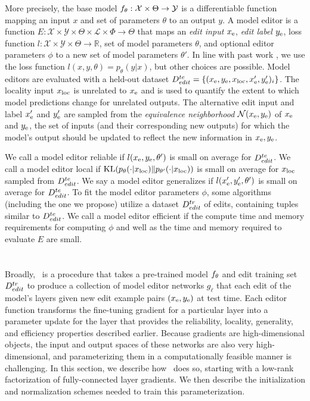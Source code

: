 \documentclass{article}
\begin{document}
More precisely, the base model $f_\theta:\mathcal{X} \times \Theta \rightarrow \mathcal{Y}$ is a differentiable function mapping an input $x$ and set of parameters $\theta$ to an output $y$. A model editor is a function $E : \mathcal{X} \times \mathcal{Y} \times \Theta \times \mathcal{L} \times \Phi \rightarrow \Theta$ that maps an \textit{edit input} $x_\text{e}$, \textit{edit label} $y_\text{e}$, loss function $l:\mathcal{X} \times \mathcal{Y} \times \Theta \rightarrow \mathbb{R}$, set of model parameters $\theta$, and optional editor parameters $\phi$ to a new set of model parameters $\theta'$. In line with past work \citep{Sinitsin2020Editable,Cao2021EditingFK}, we use the loss function $l(x,y,\theta) = p_\theta(y|x)$, but other choices are possible. Model editors are evaluated with a held-out dataset $D^{te}_{edit} = \{(x_\text{e},y_\text{e},x_\text{loc},x_\text{e}',y_\text{e}')_i\}$. The locality input $x_\text{loc}$ is unrelated to $x_\text{e}$ and is used to quantify the extent to which model predictions change for unrelated outputs. The alternative edit input and label $x_\text{e}'$ and $y_\text{e}'$ are sampled from the \textit{equivalence neighborhood} $\mathcal{N}(x_\text{e},y_\text{e})$ of $x_\text{e}$ and $y_\text{e}$, the set of inputs (and their corresponding new outputs) for which the model's output should be updated to reflect the new information in $x_\text{e},y_\text{e}$.

We call a model editor reliable if $l(x_\text{e},y_\text{e},\theta')$ is small on average for $D^{te}_{edit}$. We call a model editor local if $\text{KL}(p_\theta(\cdot | x_\text{loc}) \| p_{\theta'}(\cdot | x_\text{loc}))$ is small on average for $x_\text{loc}$ sampled from $D^{te}_{edit}$. We say a model editor generalizes if $l(x_\text{e}',y_\text{e}',\theta')$ is small on average for $D^{te}_{edit}$. To fit the model editor parameters $\phi$, some algorithms (including the one we propose) utilize a dataset $D^{tr}_{edit}$ of edits, containing tuples similar to $D^{te}_{edit}$. We call a model editor efficient if the compute time and memory requirements for computing $\phi$ and well as the time and memory required to evaluate $E$ are small.

\section{\fullname}
Broadly, \name~is a procedure that takes a pre-trained model $f_\theta$ and edit training set $D^{tr}_{edit}$ to produce a collection of model editor networks $g_\ell$ that each edit of the model's layers given new edit example pairs $(x_\text{e}, y_\text{e})$ at test time. Each editor function transforms the fine-tuning gradient for a particular layer into a parameter update for the layer that provides the reliability, locality, generality, and efficiency properties described earlier. Because gradients are high-dimensional objects, the input and output spaces of these networks are also very high-dimensional, and parameterizing them in a computationally feasible manner is challenging. In this section, we describe how \name~does so, starting with a low-rank factorization of fully-connected layer gradients. We then describe the initialization and normalization schemes needed to train this parameterization.
\end{document}
